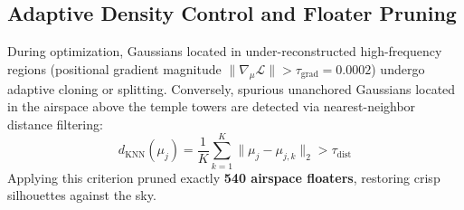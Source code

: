 \documentclass[11pt,a4paper]{article}
\begin{document}
\subsection{Adaptive Density Control and Floater Pruning}
During optimization, Gaussians located in under-reconstructed high-frequency regions (positional gradient magnitude $\|\nabla_{\mu} \mathcal{L}\| > \tau_{\text{grad}} = 0.0002$) undergo adaptive cloning or splitting. Conversely, spurious unanchored Gaussians located in the airspace above the temple towers are detected via nearest-neighbor distance filtering:
\begin{equation}
    d_{\text{KNN}}(\mu_j) = \frac{1}{K} \sum_{k=1}^K \| \mu_j - \mu_{j, k} \|_2 > \tau_{\text{dist}}
    \label{eq:knn_prune}
\end{equation}
Applying this criterion pruned exactly \textbf{540 airspace floaters}, restoring crisp silhouettes against the sky.
\end{document}
